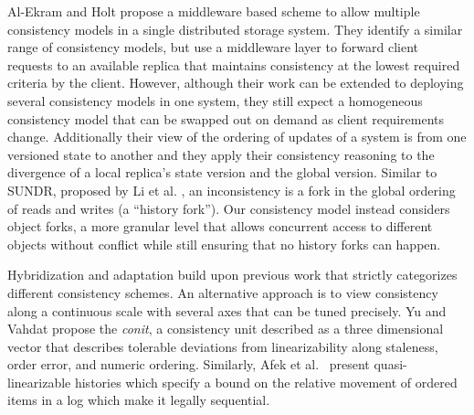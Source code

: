 Al-Ekram and Holt \cite{multi_consistency} propose a middleware
based scheme to allow multiple consistency models in a single distributed
storage system.
They identify a similar range of consistency models, but use a middleware
layer to forward client requests to an available replica that maintains
consistency at the lowest required criteria by the client.
However, although their work can be extended to deploying several consistency
models in one system, they still expect a homogeneous consistency model that
can be swapped out on demand as client requirements change.
Additionally their view of the ordering of updates of a system is from one
versioned state to another and they apply their consistency reasoning to the
divergence of a local replica's state version and the global version.
Similar to SUNDR, proposed by Li et al.
\cite{sundr}, an inconsistency is a fork in the global ordering of
reads and writes (a ``history fork'').
Our consistency model instead considers object forks, a more granular level
that allows concurrent access to different objects without conflict while
still ensuring that no history forks can happen.

Hybridization and adaptation build upon previous work that strictly
categorizes different consistency schemes.
An alternative approach is to view consistency along a continuous scale with
several axes that can be tuned precisely.
Yu and Vahdat \cite{conit_continous_consistency} propose the \textit{conit}, a consistency
unit described as a three dimensional vector that describes tolerable
deviations from linearizability along staleness, order error, and numeric
ordering.
Similarly, Afek et al.~\cite{quasi_linearizability} present quasi-linearizable histories
which specify a bound on the relative movement of ordered items in a log which
make it legally sequential.
